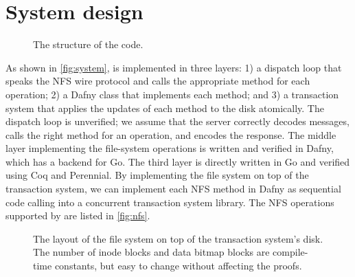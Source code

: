 \section{System design}%
\label{sec:system}


\begin{figure}
  \center
  
  \caption{The structure of the code.}
  \label{fig:system}
\end{figure}

As shown in \autoref{fig:system}, \sys is implemented in three layers:
1) a dispatch loop that speaks the NFS wire protocol and calls the
appropriate method for each operation; 2) a Dafny class that
implements each method; and 3) a transaction system that applies the
updates of each method to the disk atomically.  The dispatch loop is
unverified; we assume that the server correctly decodes messages,
calls the right method for an operation, and encodes the response. The
middle layer implementing the file-system operations is written
and verified in Dafny, which has a backend for Go.  The
third layer is directly written in Go and verified using Coq and
Perennial.  By implementing the file system on top of the transaction
system, we can implement each NFS method in Dafny as sequential code
calling into a concurrent transaction system library. The NFS
operations supported by \sys are listed in \autoref{fig:nfs}.


\begin{figure}
  
  \vspace{-1.75em}
  \caption{The layout of the file system on top of the transaction system's
    disk. The number of inode blocks and data bitmap blocks are compile-time
    constants, but easy to change without affecting the proofs.}
  \label{fig:layout}
\end{figure}

